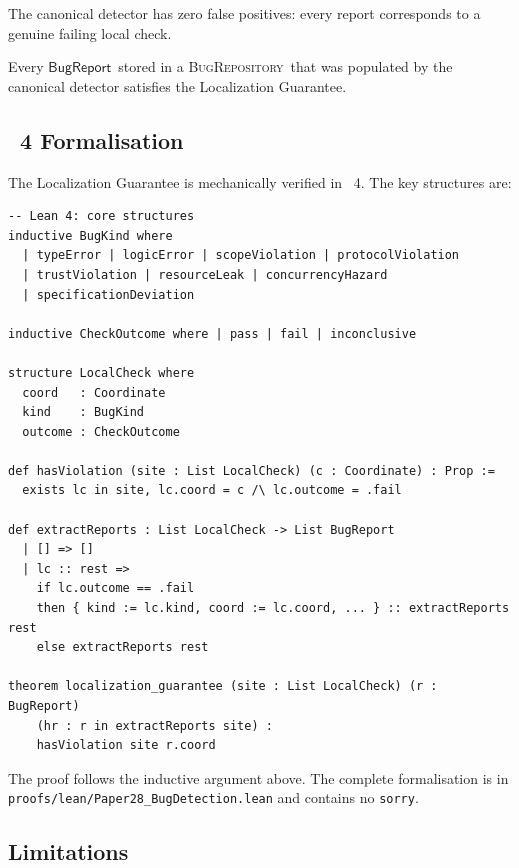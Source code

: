 \documentclass[11pt]{article}
\newcommand{\BugRep}{\ensuremath{\mathsf{BugReport}}}          %
\newcommand{\BugRepo}{\textsc{BugRepository}}     %
\begin{document}
\begin{corollary}\label{cor:fp-free}
The canonical detector has zero false positives: every report corresponds
to a genuine failing local check.
\end{corollary}

\begin{corollary}\label{cor:repo-sound}
Every \BugRep\ stored in a \BugRepo\ that was populated by the canonical
detector satisfies the Localization Guarantee.
\end{corollary}

\subsection{\LEAN~4 Formalisation}

The Localization Guarantee is mechanically verified in \LEAN~4.  The key
structures are:

\begin{lstlisting}[style=jugeo-python,language={}]
-- Lean 4: core structures
inductive BugKind where
  | typeError | logicError | scopeViolation | protocolViolation
  | trustViolation | resourceLeak | concurrencyHazard
  | specificationDeviation

inductive CheckOutcome where | pass | fail | inconclusive

structure LocalCheck where
  coord   : Coordinate
  kind    : BugKind
  outcome : CheckOutcome

def hasViolation (site : List LocalCheck) (c : Coordinate) : Prop :=
  exists lc in site, lc.coord = c /\ lc.outcome = .fail

def extractReports : List LocalCheck -> List BugReport
  | [] => []
  | lc :: rest =>
    if lc.outcome == .fail
    then { kind := lc.kind, coord := lc.coord, ... } :: extractReports rest
    else extractReports rest

theorem localization_guarantee (site : List LocalCheck) (r : BugReport)
    (hr : r in extractReports site) :
    hasViolation site r.coord
\end{lstlisting}

The proof follows the inductive argument above.  The complete formalisation
is in \texttt{proofs/lean/Paper28\_BugDetection.lean} and contains no
\texttt{sorry}.

\subsection{Limitations}
\end{document}
